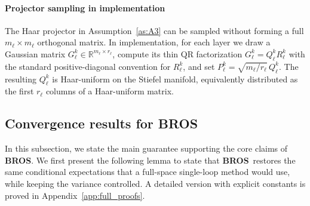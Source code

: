 \documentclass{pkumelon}
\theoremstyle{plain}
\newcommand{\oursname}{\textnormal{\textbf{BROS}}}
\newcommand{\ours}{\oursname\ }
\newcommand{\ourslast}{\oursname}
\begin{document}
\paragraph{Projector sampling in implementation}
The Haar projector in Assumption~\ref{as:A3} can be sampled without forming a full $m_\ell\times m_\ell$ orthogonal matrix. In implementation, for each layer we draw a Gaussian matrix $G_\ell^k\in\mathbb R^{m_\ell\times r_\ell}$, compute its thin QR factorization $G_\ell^k=Q_\ell^kR_\ell^k$ with the standard positive-diagonal convention for $R_\ell^k$, and set $P_\ell^k=\sqrt{m_\ell/r_\ell}\,Q_\ell^k$. The resulting $Q_\ell^k$ is Haar-uniform on the Stiefel manifold, equivalently distributed as the first $r_\ell$ columns of a Haar-uniform matrix.

\subsection{Convergence results for \ours}
\label{subsec:main_convergence}
In this subsection, we state the main guarantee supporting the core claims of \ourslast. We first present the following lemma to state that \ours restores the same conditional expectations that a full-space single-loop method would use, while keeping the variance controlled. A detailed version with explicit constants is proved in Appendix~\ref{app:full_proofs}.
\end{document}
